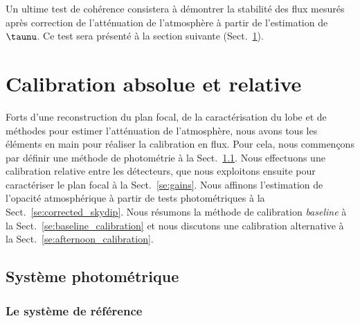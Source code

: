 Un ultime test de cohérence consistera à démontrer la stabilité des
flux mesurés après correction de l'atténuation de l'atmosphère à
partir de l'estimation de $\taunu$. Ce test sera présenté à la section
suivante (Sect.~\ref{se:calibration}). 



%
%
%
%
%
%
%
%
\section{Calibration absolue et relative}
\label{se:calibration}

Forts d'une reconstruction du plan focal, de la
caractérisation du lobe et de méthodes pour estimer l'atténuation de
l'atmosphère, nous avons tous les éléments en main pour réaliser la
calibration en flux. Pour cela, nous commençons par définir une
méthode de photométrie à la Sect.~\ref{se:systeme_photo}. Nous
effectuons une calibration relative entre les détecteurs, que nous
exploitons ensuite pour caractériser le plan focal à la
Sect.~\ref{se:gains}. Nous affinons l'estimation de l'opacité
atmosphérique à partir de tests photométriques à la
Sect.~\ref{se:corrected_skydip}. Nous résumons la méthode de
calibration \emph{baseline} à la Sect.~\ref{se:baseline_calibration}
et nous discutons une calibration alternative à la
Sect.~\ref{se:afternoon_calibration}.
        
\subsection{Système photométrique}
\label{se:systeme_photo}

\subsubsection{Le système de référence}

